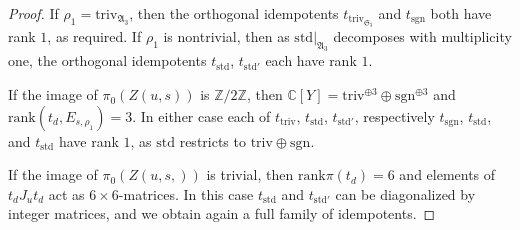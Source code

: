 \documentclass[10pt]{article}
\newcommand{\Z}{\mathbb{Z}}
\newcommand{\C}{\mathbb{C}}
\newcommand{\Sn}{\mathfrak{S}}
\newcommand{\An}{\mathfrak{A}}
\newcommand{\triv}{\mathrm{triv}}
\newcommand{\sgn}{\mathrm{sgn}}
\theoremstyle{definition}
\theoremstyle{remark}
\newcommand{\std}{\mathrm{std}}
\begin{document}
\begin{proof}
If $\rho_1=\triv_{\An_3}$, then the orthogonal idempotents $t_{\triv_{\Sn_3}}$ and $t_{\sgn}$ both have rank $1$, as required. If $\rho_1$ is nontrivial, then as $\std|_{\An_3}$ decomposes with multiplicity one, the orthogonal idempotents $t_{\std}$, $t_{\std'}$ each have rank $1$.

If the image of $\pi_0(Z(u,s))$ is $\Z/2\Z$, then $\C[Y]=\triv^{\oplus 3}\oplus\sgn^{\oplus 3}$ and $\mathrm{rank}(
t_d, E_{s,\rho_1})=3$.
In either case each of $t_{\triv}$, $t_{\std}$, $t_{\std'}$, respectively $t_{\sgn}$, $t_{\std}$, and $t_{\std}$ have rank $1$, as $\std$ restricts to $\triv\oplus\sgn$.

If the image of $\pi_0(Z(u,s,))$ is trivial, then $\mathrm{rank}\pi(t_d)=6$ and elements of $t_dJ_ut_d$ act as $6\times 6$-matrices. In this case $t_{\std}$ and $t_{\std'}$ can be diagonalized by integer matrices, and we obtain again a full family of idempotents.
%
\end{proof}





%
\end{document}

